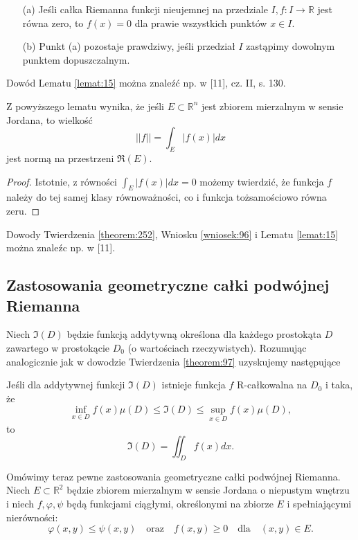 \documentclass[leqno]{article}
\begin{document}
\begin{justify}
\begin{lemat}
{
    \begin{itemize}
        \item [(a)] Jeśli całka Riemanna funkcji nieujemnej na przedziale $I, f : I \to \mathbb{R}$ jest równa zero, to $f(x) = 0$ dla prawie 
            wszystkich punktów $x \in I$.
        \item [(b)] Punkt (a) pozostaje prawdziwy, jeśli przedział $I$ zastąpimy dowolnym punktem dopuszczalnym.
    \end{itemize}
}
\end{lemat}

Dowód Lematu \ref{lemat:15} można znaleźć np. w [11], cz. II, s. 130.

\begin{uwaga}
    Z powyższego lematu wynika, że jeśli $E \subset \mathbb{R}^n$ jest zbiorem mierzalnym w sensie Jordana, to wielkość 
    \[
        ||f|| = \int_{E}|f(x)|dx
    \]
    jest normą na przestrzeni $\mathfrak{R}(E)$.
\end{uwaga}

\begin{proof}
    Istotnie, z równości $\int_E |f(x)|dx = 0$ możemy twierdzić, że funkcja $f$ należy do tej samej klasy równoważności, co i funkcja tożsamościowo równa zeru.
\end{proof}

Dowody Twierdzenia \ref{theorem:252}, Wniosku \ref{wniosek:96} i Lematu \ref{lemat:15} można znaleźc np. w [11].

\subsection{Zastosowania geometryczne całki podwójnej Riemanna}

Niech $\mathfrak{I}(D)$ będzie funkcją addytywną określona dla każdego prostokąta $D$ zawartego w prostokącie $D_0$ (o wartościach rzeczywistych).
Rozumując analogicznie jak w dowodzie Twierdzenia \ref{theorem:97} uzyskujemy następujące 

\begin{theorem}
{
    Jeśli dla addytywnej funkcji $\mathfrak{I}(D)$ istnieje funkcja $f$ R-całkowalna na $D_0$ i taka, że 
    \[
        \inf_{x \in D}f(x)\mu(D) \leqslant \mathfrak{I}(D) \leqslant \sup_{x \in D}f(x)\mu(D),
    \]
    to 
    \[
        \mathfrak{I}(D) = \iint_D f(x)dx.
    \]
}
\end{theorem}

Omówimy teraz pewne zastosowania geometryczne całki podwójnej Riemanna. Niech $E \subset \mathbb{R}^2$ będzie zbiorem mierzalnym w sensie Jordana 
o niepustym wnętrzu i niech $f, \varphi, \psi$ będą funkcjami ciągłymi, określonymi na zbiorze $E$ i spełniającymi nierówności:
\[
    \varphi(x,y) \leqslant \psi(x,y) \quad \text{oraz} \quad f(x,y) \geqslant 0 \quad \text{dla} \quad (x,y) \in E. 
\]


\end{justify}
\end{document}
